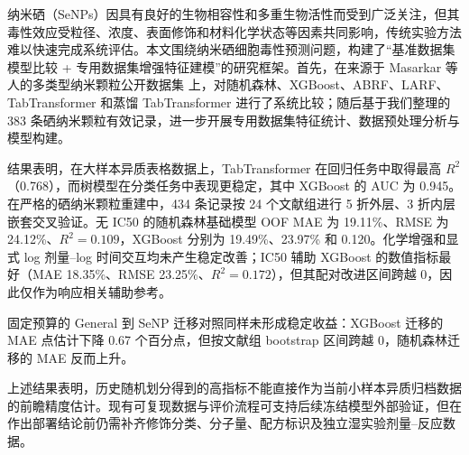 纳米硒（SeNPs）因具有良好的生物相容性和多重生物活性而受到广泛关注，但其毒性效应受粒径、浓度、表面修饰和材料化学状态等因素共同影响，传统实验方法难以快速完成系统评估。本文围绕纳米硒细胞毒性预测问题，构建了“基准数据集模型比较 + 专用数据集增强特征建模”的研究框架。首先，在来源于 Masarkar 等人的多类型纳米颗粒公开数据集 \cite{masarkar2024} 上，对随机森林、XGBoost、ABRF、LARF、TabTransformer 和蒸馏 TabTransformer 进行了系统比较；随后基于我们整理的 383 条硒纳米颗粒有效记录，进一步开展专用数据集特征统计、数据预处理分析与模型构建。

结果表明，在大样本异质表格数据上，TabTransformer 在回归任务中取得最高 $R^2$（0.768），而树模型在分类任务中表现更稳定，其中 XGBoost 的 AUC 为 0.945。在严格的硒纳米颗粒重建中，434 条记录按 24 个文献组进行 5 折外层、3 折内层嵌套交叉验证。无 IC50 的随机森林基础模型 OOF MAE 为 19.11\%、RMSE 为 24.12\%、$R^2=0.109$，XGBoost 分别为 19.49\%、23.97\% 和 0.120。化学增强和显式 log 剂量--log 时间交互均未产生稳定改善；IC50 辅助 XGBoost 的数值指标最好（MAE 18.35\%、RMSE 23.25\%、$R^2=0.172$），但其配对改进区间跨越 0，因此仅作为响应相关辅助参考。

固定预算的 General 到 SeNP 迁移对照同样未形成稳定收益：XGBoost 迁移的 MAE 点估计下降 0.67 个百分点，但按文献组 bootstrap 区间跨越 0，随机森林迁移的 MAE 反而上升。

上述结果表明，历史随机划分得到的高指标不能直接作为当前小样本异质归档数据的前瞻精度估计。现有可复现数据与评价流程可支持后续冻结模型外部验证，但在作出部署结论前仍需补齐修饰分类、分子量、配方标识及独立湿实验剂量--反应数据。
